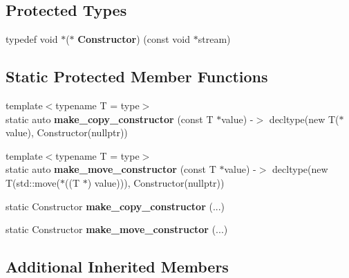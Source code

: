\subsection*{Protected Types}
\begin{DoxyCompactItemize}
\item 
typedef void $\ast$($\ast$ {\bfseries Constructor}) (const void $\ast$stream)\hypertarget{classtype__caster__base_aadce200e520c8cef842febdf7d7affd6}{}\label{classtype__caster__base_aadce200e520c8cef842febdf7d7affd6}

\end{DoxyCompactItemize}
\subsection*{Static Protected Member Functions}
\begin{DoxyCompactItemize}
\item 
{\footnotesize template$<$typename T  = type$>$ }\\static auto {\bfseries make\+\_\+copy\+\_\+constructor} (const T $\ast$value) -\/$>$ decltype(new T($\ast$value), Constructor(nullptr))\hypertarget{classtype__caster__base_ad9d191bade30d752429631d1d05b226e}{}\label{classtype__caster__base_ad9d191bade30d752429631d1d05b226e}

\item 
{\footnotesize template$<$typename T  = type$>$ }\\static auto {\bfseries make\+\_\+move\+\_\+constructor} (const T $\ast$value) -\/$>$ decltype(new T(std\+::move($\ast$((T $\ast$) value))), Constructor(nullptr))\hypertarget{classtype__caster__base_a10a77016b8e22a0c28a16337937b966c}{}\label{classtype__caster__base_a10a77016b8e22a0c28a16337937b966c}

\item 
static Constructor {\bfseries make\+\_\+copy\+\_\+constructor} (...)\hypertarget{classtype__caster__base_a8d096e63217768f54daacdfc1cfb4b22}{}\label{classtype__caster__base_a8d096e63217768f54daacdfc1cfb4b22}

\item 
static Constructor {\bfseries make\+\_\+move\+\_\+constructor} (...)\hypertarget{classtype__caster__base_a24699183cc7c1c07c2a3de7674ca7419}{}\label{classtype__caster__base_a24699183cc7c1c07c2a3de7674ca7419}

\end{DoxyCompactItemize}
\subsection*{Additional Inherited Members}


